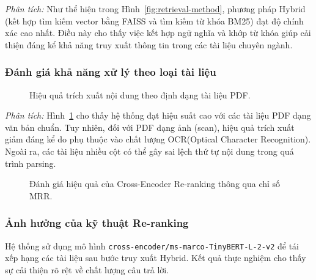 ﻿\documentclass[10pt, conference, a4paper, compsocconf]{IEEEtran}
\begin{document}
\textit{Phân tích:}
Như thể hiện trong Hình~\ref{fig:retrieval-method}, phương pháp Hybrid (kết hợp tìm kiếm vector bằng FAISS và tìm kiếm từ khóa BM25) đạt độ chính xác cao nhất. 
Điều này cho thấy việc kết hợp ngữ nghĩa và khớp từ khóa giúp cải thiện đáng kể khả năng truy xuất thông tin trong các tài liệu chuyên ngành.

\subsubsection{Đánh giá khả năng xử lý theo loại tài liệu}

\begin{figure}[H]
\centering
{}
\caption{Hiệu quả trích xuất nội dung theo định dạng tài liệu PDF.}
\label{fig:pdf-extraction}
\end{figure}

\textit{Phân tích:}
Hình~\ref{fig:pdf-extraction} cho thấy hệ thống đạt hiệu suất cao với các tài liệu PDF dạng văn bản chuẩn. 
Tuy nhiên, đối với PDF dạng ảnh (scan), hiệu quả trích xuất giảm đáng kể do phụ thuộc vào chất lượng OCR(Optical Character Recognition). 
Ngoài ra, các tài liệu nhiều cột có thể gây sai lệch thứ tự nội dung trong quá trình parsing.

\begin{figure}[H]
\centering
{}
\caption{Đánh giá hiệu quả của Cross-Encoder Re-ranking thông qua chỉ số MRR.}
\label{fig:rerank-impact}
\end{figure}
\subsubsection{Ảnh hưởng của kỹ thuật Re-ranking}
Hệ thống sử dụng mô hình \texttt{cross-encoder/ms-marco-TinyBERT-L-2-v2} để tái xếp hạng các tài liệu sau bước truy xuất Hybrid. Kết quả thực nghiệm cho thấy sự cải thiện rõ rệt về chất lượng câu trả lời.
\end{document}
